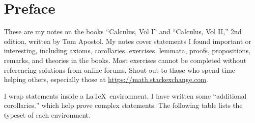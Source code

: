 \chapter*{Preface}

These are my notes on the books ``Calculus, Vol I'' and ``Calculus, Vol II,'' 2nd edition, written by Tom Apostol.
My notes cover statements I found important or interesting, including axioms, corollaries, exercises, lemmata, proofs, propositions, remarks, and theories in the books.
Most exercises cannot be completed without referencing solutions from online forums.
Shout out to those who spend time helping others, especially those at \url{https://math.stackexchange.com}.

I wrap statements inside a \LaTeX\ environment.
I have written some ``additional corollaries,'' which help prove complex statements.
The following table lists the typeset of each environment.
